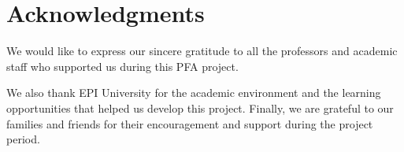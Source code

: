 \section*{Acknowledgments}
\label{sec::Acknowledgments}

We would like to express our sincere gratitude to all the professors and academic staff who supported us during this PFA project.

We also thank EPI University for the academic environment and the learning opportunities that helped us develop this project. Finally, we are grateful to our families and friends for their encouragement and support during the project period.

\vspace*{\fill}
